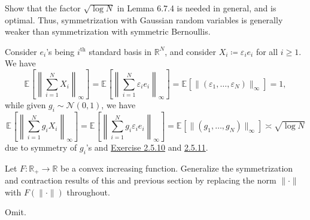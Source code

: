 \begin{problem*}[Exercise 6.7.5]\label{ex6.7.5}
	Show that the factor \(\sqrt{\log N} \) in Lemma 6.7.4 is needed in general, and is optimal. Thus, symmetrization with Gaussian random variables is generally weaker than symmetrization with symmetric Bernoullis.
\end{problem*}
\begin{answer}
	Consider \(e_i\)'s being \(i^{\text{th} }\) standard basis in \(\mathbb{R} ^N\), and consider \(X_i \coloneqq \varepsilon _i e_i\) for all \(i \geq 1\). We have
	\[
		\mathbb{E}_{}\left[\left\lVert \sum_{i=1}^{N} X_i \right\rVert _\infty \right]
		= \mathbb{E}_{}\left[\left\lVert \sum_{i=1}^{N} \varepsilon _i e_i \right\rVert _\infty \right]
		= \mathbb{E}_{}[\lVert (\varepsilon _1, \dots , \varepsilon _N) \rVert _\infty ]
		= 1,
	\]
	while given \(g_i \sim \mathcal{N} (0, 1)\), we have
	\[
		\mathbb{E}_{}\left[\left\lVert \sum_{i=1}^{N} g_i X_i \right\rVert _\infty \right]
		= \mathbb{E}_{}\left[\left\lVert \sum_{i=1}^{N} g_i \varepsilon _i e_i \right\rVert _\infty \right]
		= \mathbb{E}_{}[\lVert (g_1, \dots , g_N) \rVert _\infty ]
		\asymp \sqrt{\log N}
	\]
	due to symmetry of \(g_i\)'s and \hyperref[ex2.5.10]{Exercise 2.5.10} and \hyperref[ex2.5.11]{2.5.11}.
\end{answer}

\begin{problem*}[Exercise 6.7.6]\label{ex6.7.6}
	Let \(F\colon \mathbb{R} _+ \to \mathbb{R} \) be a convex increasing function. Generalize the symmetrization and contraction results of this and previous section by replacing the norm \(\lVert \cdot \rVert \) with \(F(\lVert \cdot \rVert )\) throughout.
\end{problem*}
\begin{answer}
	Omit.
\end{answer}

